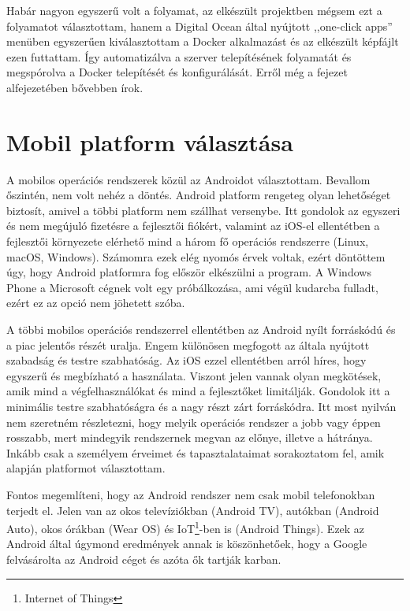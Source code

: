 \documentclass{thesis-ekf}
\theoremstyle{definition}
\theoremstyle{remark}
\begin{document}
Habár nagyon egyszerű volt a folyamat, az elkészült projektben mégsem ezt a folyamatot választottam, hanem a Digital Ocean által nyújtott ,,one-click apps'' menüben egyszerűen kiválasztottam a Docker alkalmazást és az elkészült képfájlt ezen futtattam. 
Így automatizálva a szerver telepítésének folyamatát és megspórolva a Docker telepítését és konfigurálását.
Erről még a  fejezet  alfejezetében bővebben írok.

\section{Mobil platform választása}

A mobilos operációs rendszerek közül az Androidot választottam. Bevallom őszintén, nem volt nehéz a döntés. 
Android platform rengeteg olyan lehetőséget biztosít, amivel a többi platform nem szállhat versenybe.
Itt gondolok az egyszeri és nem megújuló fizetésre a fejlesztői fiókért, valamint az iOS-el ellentétben a fejlesztői környezete elérhető mind a három fő operációs rendszerre (Linux, macOS, Windows).
Számomra ezek elég nyomós érvek voltak, ezért döntöttem úgy, hogy Android platformra fog először elkészülni a program.
A Windows Phone a Microsoft cégnek volt egy próbálkozása, ami végül kudarcba fulladt, ezért ez az opció nem jöhetett szóba.

A többi mobilos operációs rendszerrel ellentétben az Android nyílt forráskódú és a piac jelentős részét uralja.
Engem különösen megfogott az általa nyújtott szabadság és testre szabhatóság.
Az iOS ezzel ellentétben arról híres, hogy egyszerű és megbízható a használata.
Viszont jelen vannak olyan megkötések, amik mind a végfelhasználókat és mind a fejlesztőket limitálják.
Gondolok itt a minimális testre szabhatóságra és a nagy részt zárt forráskódra.
Itt most nyilván nem szeretném részletezni, hogy melyik operációs rendszer a jobb vagy éppen rosszabb, mert mindegyik rendszernek megvan az előnye, illetve a hátránya.
Inkább csak a személyem érveimet és tapasztalataimat sorakoztatom fel, amik alapján platformot választottam.

Fontos megemlíteni, hogy az Android rendszer nem csak mobil telefonokban terjedt el.
Jelen van az okos televíziókban (Android TV), autókban (Android Auto), okos órákban (Wear OS) és IoT\footnote{Internet of Things}-ben is (Android Things).
Ezek az Android által úgymond eredmények annak is köszönhetőek, hogy a Google felvásárolta az Android céget és azóta ők tartják karban.
\end{document}
